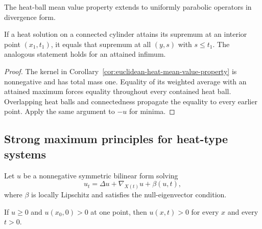 \begin{remark}
\label{rem:divergence-form-mean-value-property}
The heat-ball mean value property extends to uniformly parabolic operators in
divergence form.
\end{remark}

\begin{corollary}
\label{cor:heat-mean-value-strong-maximum-principle}
If a heat solution on a connected cylinder attains its supremum at an
interior point $(x_1,t_1)$, it equals that supremum at all $(y,s)$ with
$s\leq t_1$.  The analogous statement holds for an attained infimum.
\end{corollary}

\begin{proof}
The kernel in Corollary~\ref{cor:euclidean-heat-mean-value-property} is
nonnegative and has total mass one.  Equality of its weighted average with an
attained maximum forces equality throughout every contained heat ball.
Overlapping heat balls and connectedness propagate the equality to every
earlier point.  Apply the same argument to $-u$ for minima.
\end{proof}

\subsection{Strong maximum principles for heat-type systems}

Let $u$ be a nonnegative symmetric bilinear form solving
\[
u_t=\Delta u+\nabla_{X(t)}u+\beta(u,t),
\]
where $\beta$ is locally Lipschitz and satisfies the null-eigenvector
condition.

\begin{proposition}
\label{prop:system-strong-maximum-principle-positive-definite}
If $u\geq0$ and $u(x_0,0)>0$ at one point, then
$u(x,t)>0$ for every $x$ and every $t>0$.
\end{proposition}

